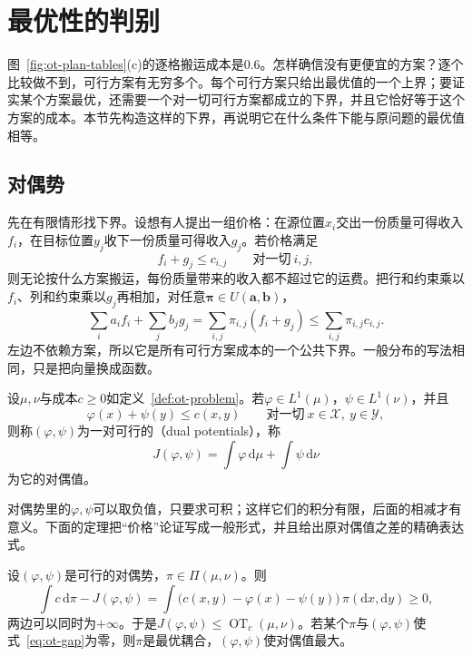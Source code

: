 \section{最优性的判别}
\label{sec:ot-optimality}

图~\ref{fig:ot-plan-tables}(c)的逐格搬运成本是$0.6$。怎样确信没有更便宜的方案？逐个比较做不到，可行方案有无穷多个。每个可行方案只给出最优值的一个上界；要证实某个方案最优，还需要一个对一切可行方案都成立的下界，并且它恰好等于这个方案的成本。本节先构造这样的下界，再说明它在什么条件下能与原问题的最优值相等。

\subsection{对偶势}
\label{sec:ot-potentials}

先在有限情形找下界。设想有人提出一组价格：在源位置$x_i$交出一份质量可得收入$f_i$，在目标位置$y_j$收下一份质量可得收入$g_j$。若价格满足
\[
 f_i+g_j\leq c_{i,j}\qquad\text{对一切}\ i,j ,
\]
则无论按什么方案搬运，每份质量带来的收入都不超过它的运费。把行和约束乘以$f_i$、列和约束乘以$g_j$再相加，对任意$\bm{\pi}\in U(\bm{a},\bm{b})$，
\[
 \sum_ia_if_i+\sum_jb_jg_j=\sum_{i,j}\pi_{i,j}(f_i+g_j)\leq\sum_{i,j}\pi_{i,j}c_{i,j} .
\]
左边不依赖方案，所以它是所有可行方案成本的一个公共下界。一般分布的写法相同，只是把向量换成函数。

\begin{definition}[对偶势]
\label{def:ot-potentials}
设$\mu,\nu$与成本$c\geq0$如定义~\ref{def:ot-problem}。若$\varphi\in L^{1}(\mu)$，$\psi\in L^{1}(\nu)$，并且
\begin{equation}
 \varphi(x)+\psi(y)\leq c(x,y)\qquad\text{对一切}\ x\in\mathcal{X},\ y\in\mathcal{Y},
 \label{eq:ot-dual-constraint}
\end{equation}
则称$(\varphi,\psi)$为一对可行的（dual potentials），称
\begin{equation}
 J(\varphi,\psi)=\int\varphi\,\mathrm{d}\mu+\int\psi\,\mathrm{d}\nu
 \label{eq:ot-dual-value}
\end{equation}
为它的对偶值。
\end{definition}

对偶势里的$\varphi,\psi$可以取负值，只要求可积；这样它们的积分有限，后面的相减才有意义。下面的定理把“价格”论证写成一般形式，并且给出原对偶值之差的精确表达式。

\begin{theorem}[弱对偶与原对偶差]
\label{thm:ot-weak-duality}
设$(\varphi,\psi)$是可行的对偶势，$\pi\in\Pi(\mu,\nu)$。则
\begin{equation}
 \int c\,\mathrm{d}\pi-J(\varphi,\psi)=\int\bigl(c(x,y)-\varphi(x)-\psi(y)\bigr)\,\pi(\mathrm{d}x,\mathrm{d}y)\geq0 ,
 \label{eq:ot-gap}
\end{equation}
两边可以同时为$+\infty$。于是$J(\varphi,\psi)\leq\operatorname{OT}_c(\mu,\nu)$。若某个$\pi$与$(\varphi,\psi)$使式~\eqref{eq:ot-gap}为零，则$\pi$是最优耦合，$(\varphi,\psi)$使对偶值最大。
\end{theorem}

